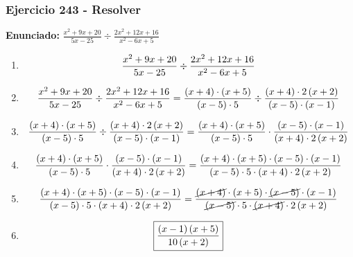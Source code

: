 \documentclass[11pt,a4paper]{article}
\newcommand{\fitmath}[1]{%
\[
\setbox0=\hbox{$\displaystyle #1$}%
\ifdim\wd0>\linewidth
\resizebox{\linewidth}{!}{$\displaystyle #1$}%
\else
#1%
\fi
\]
}
\begin{document}
\subsubsection*{Ejercicio 243 - Resolver}
\textbf{Enunciado:} $ \frac{x^{2} + 9 x + 20}{5 x - 25} \div \frac{2 x^{2} + 12 x + 16}{x^{2} - 6 x + 5} $\par
\begin{enumerate}[leftmargin=2em]
\item \fitmath{\frac{x^{2} + 9 x + 20}{5 x - 25} \div \frac{2 x^{2} + 12 x + 16}{x^{2} - 6 x + 5}}
\item \fitmath{\frac{x^{2} + 9 x + 20}{5 x - 25} \div \frac{2 x^{2} + 12 x + 16}{x^{2} - 6 x + 5}= \frac{\left(x + 4\right)\cdot \left(x + 5\right)}{\left(x - 5\right)\cdot 5} \div \frac{\left(x + 4\right)\cdot 2 \left(x + 2\right)}{\left(x - 5\right)\cdot \left(x - 1\right)}}
\item \fitmath{\frac{\left(x + 4\right)\cdot \left(x + 5\right)}{\left(x - 5\right)\cdot 5}\div \frac{\left(x + 4\right)\cdot 2 \left(x + 2\right)}{\left(x - 5\right)\cdot \left(x - 1\right)}= \frac{\left(x + 4\right)\cdot \left(x + 5\right)}{\left(x - 5\right)\cdot 5}\cdot \frac{\left(x - 5\right)\cdot \left(x - 1\right)}{\left(x + 4\right)\cdot 2 \left(x + 2\right)}}
\item \fitmath{\frac{\left(x + 4\right)\cdot \left(x + 5\right)}{\left(x - 5\right)\cdot 5}\cdot \frac{\left(x - 5\right)\cdot \left(x - 1\right)}{\left(x + 4\right)\cdot 2 \left(x + 2\right)}= \frac{\left(x + 4\right)\cdot \left(x + 5\right)\cdot \left(x - 5\right)\cdot \left(x - 1\right)}{\left(x - 5\right)\cdot 5\cdot \left(x + 4\right)\cdot 2 \left(x + 2\right)}}
\item \fitmath{\frac{\left(x + 4\right)\cdot \left(x + 5\right)\cdot \left(x - 5\right)\cdot \left(x - 1\right)}{\left(x - 5\right)\cdot 5\cdot \left(x + 4\right)\cdot 2 \left(x + 2\right)}= \frac{\cancel{\left(x + 4\right)}\cdot \left(x + 5\right)\cdot \cancel{\left(x - 5\right)}\cdot \left(x - 1\right)}{\cancel{\left(x - 5\right)}\cdot 5\cdot \cancel{\left(x + 4\right)}\cdot 2 \left(x + 2\right)}}
\item \fitmath{\boxed{\frac{\left(x - 1\right) \left(x + 5\right)}{10 \left(x + 2\right)}}}
\end{enumerate}

\vspace{0.12cm}
\end{document}
